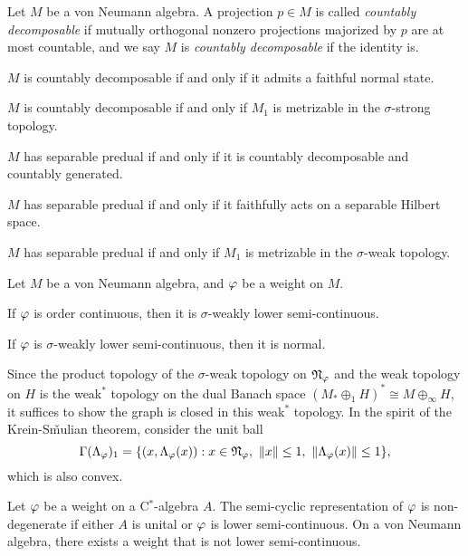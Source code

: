 \documentclass{../../large}
\begin{document}
\begin{prb}
Let $M$ be a von Neumann algebra.
A projection $p\in M$ is called \emph{countably decomposable} if mutually orthogonal nonzero projections majorized by $p$ are at most countable, and we say $M$ is \emph{countably decomposable} if the identity is.

\begin{parts}
\item $M$ is countably decomposable if and only if it admits a faithful normal state.
\item $M$ is countably decomposable if and only if $M_1$ is metrizable in the $\sigma$-strong topology.
\item $M$ has separable predual if and only if it is countably decomposable and countably generated.
\item $M$ has separable predual if and only if it faithfully acts on a separable Hilbert space.
\item $M$ has separable predual if and only if $M_1$ is metrizable in the $\sigma$-weak topology.
\end{parts}
\end{prb}
\begin{pf}
\end{pf}


\begin{prb}
Let $M$ be a von Neumann algebra, and $\varphi$ be a weight on $M$.
\begin{parts}
\item If $\varphi$ is order continuous, then it is $\sigma$-weakly lower semi-continuous.
\item If $\varphi$ is $\sigma$-weakly lower semi-continuous, then it is normal.
\end{parts}
\end{prb}
\begin{pf}
Since the product topology of the $\sigma$-weak topology on $\mathfrak{N}_\varphi$ and the weak topology on $H$ is the weak$^*$ topology on the dual Banach space $(M_*\oplus_1H)^*\cong M\oplus_\infty H$, it suffices to show the graph is closed in this weak$^*$ topology.
In the spirit of the Krein-S\v mulian theorem, consider the unit ball
\[\Gamma(\Lambda_\f)_1=\{(x,\Lambda_\f(x)):x\in\fN_\f,\ \|x\|\le1,\ \|\Lambda_\f(x)\|\le1\},\]
which is also convex.
\end{pf}

\begin{prb}
Let $\varphi$ be a weight on a C$^*$-algebra $A$.
The semi-cyclic representation of $\varphi$ is non-degenerate if either $A$ is unital or $\varphi$ is lower semi-continuous.
On a von Neumann algebra, there exists a weight that is not lower semi-continuous.
\end{prb}
\end{document}
